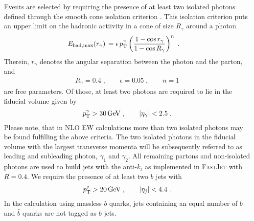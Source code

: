 Events are selected by requiring the presence of at least two 
isolated photons defined through the smooth cone isolation 
criterion \cite{Frixione:1998jh}. 
This isolation criterion puts an upper limit on the hadronic 
actiivity in a cone of size $R_\gamma$ around a photon
\begin{equation}
  \begin{split}
    E_\text{had,max}(r_\gamma)
    \,=\;&
      \epsilon\,p_\text{T}^\gamma
      \left(\frac{1-\cos r_\gamma}{1-\cos R_\gamma}\right)^n\;.
  \end{split}
\end{equation}
Therein, $r_\gamma$ denotes the angular separation between the photon 
and the parton, and
\begin{equation}
  \begin{split}
    R_\gamma=0.4\;,
    \qquad
    \epsilon=0.05\;,
    \qquad
    n=1
  \end{split}
\end{equation}
are free parameters. 
Of those, at least two photons are required to lie in the fiducial 
volume given by 
\begin{equation}
  \begin{split}
    p_\text{T}^\gamma > 30\,\text{GeV}\;,
    \qquad
    |\eta_\gamma| < 2.5\;.
  \end{split}
\end{equation}
Please note, that in NLO EW calculations more than two isolated photons 
may be found fulfilling the above criteria.
The two isolated photons in the fiducial volume with the largest 
transverse momenta will be subsequently referred to as leading and 
subleading photon, $\gamma_1$ and $\gamma_2$.
All remaining partons and non-isolated photons are used to build 
jets with the anti-$k_t$ \cite{Cacciari:2008gp} as implemented 
in \textsc{FastJet} \cite{Cacciari:2011ma} with $R=0.4$. 
We require the presence of at least two $b$ jets with 
\begin{equation}
  \begin{split}
    p_\text{T}^j > 20\,\text{GeV}\;,
    \qquad
    |\eta_j| < 4.4\;.
  \end{split}
\end{equation}
In the calculation using massless $b$ quarks, jets containing an equal 
number of $b$ and $\bar{b}$ quarks are not tagged as $b$ jets.

